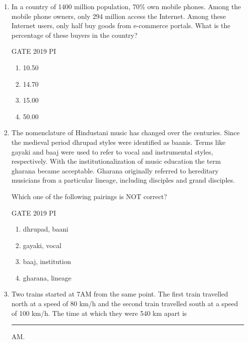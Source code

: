 \documentclass[journal,12pt,onecolumn]{IEEEtran}
\theoremstyle{remark}
\begin{document}
\begin{enumerate}
\begin{multicols}{2}
\begin{enumerate}
    \item The government sometimes takes into consideration the demands of banking institutions before reducing the interest rates on small saving schemes
    \item A reduction in interest rates on small saving schemes follow only after a reduction in repo rate by the Reserve Bank of India
\end{enumerate}
\end{multicols}

\item In a country of 1400 million population, 70\% own mobile phones. Among the mobile phone owners, only 294 million access the Internet. Among these Internet users, only half buy goods from e-commerce portals. What is the percentage of these buyers in the country?

\hfill{GATE 2019 PI}

\begin{multicols}{2}
\begin{enumerate}
    \item 10.50
    \item 14.70
    \item 15.00
    \item 50.00
\end{enumerate}
\end{multicols}

\item The nomenclature of Hindustani music has changed over the centuries. Since the medieval period dhrupad styles were identified as baanis. Terms like gayaki and baaj were used to refer to vocal and instrumental styles, respectively. With the institutionalization of music education the term gharana became acceptable. Gharana originally referred to hereditary musicians from a particular lineage, including disciples and grand disciples.

Which one of the following pairings is NOT correct?

\hfill{GATE 2019 PI}

\begin{multicols}{2}
\begin{enumerate}
    \item dhrupad, baani
    \item gayaki, vocal
    \item baaj, institution
    \item gharana, lineage
\end{enumerate}
\end{multicols}
\item Two trains started at 7AM from the same point. The first train travelled north at a speed of 80 km/h and the second train travelled south at a speed of 100 km/h. The time at which they were 540 km apart is \rule{2cm}{0.15mm} AM.


\end{enumerate}
\end{document}
